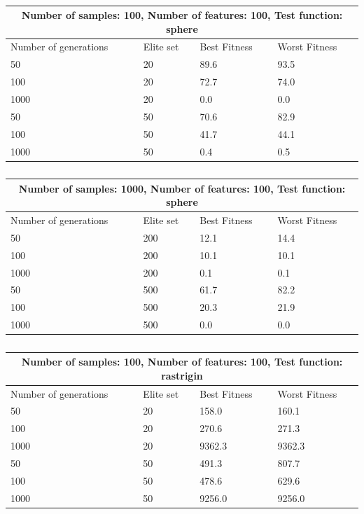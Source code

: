\documentclass{article}
\begin{document}
\begin{table}[h]
\begin{tabular}{ |p{3cm}||p{3cm}|p{3cm}|p{3cm}|  }
	\hline
	\multicolumn{4}{|c|}{Number of samples: 100, Number of features: 100, Test function: sphere} \\
	\hline
    Number of generations& Elite set & Best Fitness & Worst Fitness\\
	\hline
	50   & 20    &89.6&   93.5\\
	100 &   20  & 72.7   &74.0\\
	1000 & 20 & 0.0&  0.0\\
	50    &50 & 70.6&  82.9\\
	100&   50  & 41.7& 44.1\\
	1000& 50  & 0.4   &0.5\\
	
	\hline
\end{tabular}
\caption{\label{tab:table1} }
\end{table}

\begin{table}[h]
\begin{tabular}{ |p{3cm}||p{3cm}|p{3cm}|p{3cm}|  }
	\hline
	\multicolumn{4}{|c|}{Number of samples: 1000, Number of features: 100, Test function: sphere} \\
	\hline
	Number of generations& Elite set & Best Fitness & Worst Fitness\\
	\hline
	50   & 200    &12.1&   14.4\\
	100 &   200  & 10.1  &10.1\\
	1000 & 200 & 0.1&  0.1\\
	50    &500 & 61.7&  82.2\\
	100&   500  & 20.3& 21.9\\
	1000& 500  & 0.0   &0.0\\
	
	\hline
\end{tabular}
\caption{\label{tab:table2} }
\end{table}

\begin{table}[h]
	\begin{tabular}{ |p{3cm}||p{3cm}|p{3cm}|p{3cm}|  }
		\hline
		\multicolumn{4}{|c|}{Number of samples: 100, Number of features: 100, Test function: rastrigin} \\
		\hline
		Number of generations& Elite set & Best Fitness & Worst Fitness\\
		\hline
		50   & 20    &158.0&   160.1\\
		100 &   20  & 270.6   &271.3\\
		1000 & 20 &9362.3&  9362.3\\
		50    &50 & 491.3& 807.7\\
		100&   50  & 478.6& 629.6\\
		1000& 50  &9256.0   &9256.0\\
		
		\hline
	\end{tabular}
	\caption{\label{tab:table1.1} }
\end{table}
\end{document}

